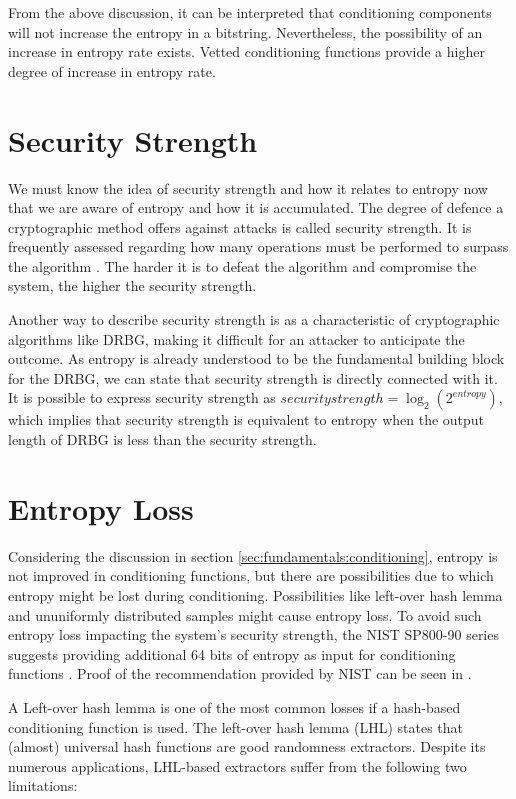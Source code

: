 From the above discussion, it can be interpreted that conditioning components will not increase the entropy in a bitstring. Nevertheless, the possibility of an increase in entropy rate exists. Vetted conditioning functions provide a higher degree of increase in entropy rate.

%
%
\section{Security Strength}
\label{sec:fundamentals:SS}

We must know the idea of security strength and how it relates to entropy now that we are aware of entropy and how it is accumulated. The degree of defence a cryptographic method offers against attacks is called security strength. It is frequently assessed regarding how many operations must be performed to surpass the algorithm \cite{SP90C-2022}. The harder it is to defeat the algorithm and compromise the system, the higher the security strength.

Another way to describe security strength is as a characteristic of cryptographic algorithms like DRBG, making it difficult for an attacker to anticipate the outcome. As entropy is already understood to be the fundamental building block for the DRBG, we can state that security strength is directly connected with it. It is possible to express security strength as $security strength=\log_{2}(2^{entropy})$, which implies that security strength is equivalent to entropy when the output length of DRBG is less than the security strength.

%
%
\section{Entropy Loss}
\label{sec:fundamentals:ES}

Considering the discussion in section \ref{sec:fundamentals:conditioning}, entropy is not improved in conditioning functions, but there are possibilities due to which entropy might be lost during conditioning. Possibilities like left-over hash lemma and ununiformly distributed samples might cause entropy loss. To avoid such entropy loss impacting the system’s security strength, the NIST SP800-90 series suggests providing additional 64 bits of entropy as input for conditioning functions \cite{SP90C-2022}. Proof of the recommendation provided by NIST can be seen in \cite{FEA-2023}.

A Left-over hash lemma is one of the most common losses if a hash-based conditioning function is used. The left-over hash lemma (LHL) \cite{LHL-2011} states that (almost) universal hash functions are good randomness extractors. Despite its numerous applications, LHL-based extractors suffer from the following two limitations:

